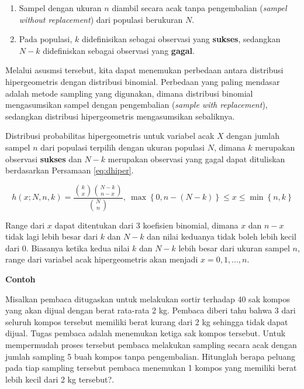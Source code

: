 \documentclass[]{book}
\providecommand{\tightlist}{%
  \setlength{\itemsep}{0pt}\setlength{\parskip}{0pt}}
\begin{document}
\begin{enumerate}
\def\labelenumi{\arabic{enumi}.}
\tightlist
\item
  Sampel dengan ukuran \(n\) diambil secara acak tanpa pengembalian
  (\emph{sampel without replacement}) dari populasi berukuran \(N\).
\item
  Pada populasi, \(k\) didefinisikan sebagai observasi yang
  \textbf{sukses}, sedangkan \(N-k\) didefiniskan sebagai observasi yang
  \textbf{gagal}.
\end{enumerate}

Melalui asusmsi tersebut, kita dapat menemukan perbedaan antara
distribusi hipergeometris dengan distribusi binomial. Perbedaan yang
paling mendasar adalah metode sampling yang digunakan, dimana distribusi
binomial mengasumsikan sampel dengan pengembalian (\emph{sample with
replacement}), sedangkan distribusi hipergeometris mengasumsikan
sebaliknya.

Distribusi probabilitas hipergeometris untuk variabel acak \(X\) dengan
jumlah sampel \(n\) dari populasi terpilih dengan ukuran populasi \(N\),
dimana \(k\) merupakan observasi \textbf{sukses} dan \(N-k\) merupakan
observasi yang gagal dapat dituliskan berdasarkan Persamaan
\eqref{eq:dhiper}.

\begin{equation}
   h\left(x;N,n,k\right)=\frac{\binom{k}{x}\binom{N-k}{n-x}}{\binom{N}{n}},\ \max\left\{0,n-\left(N-k\right)\right\}\le x\le\min\left\{n,k\right\}
  \label{eq:dhiper}
\end{equation}

Range dari \(x\) dapat ditentukan dari 3 koefisien binomial, dimana
\(x\) dan \(n-x\) tidak lagi lebih besar dari \(k\) dan \(N-k\) dan
nilai keduanya tidak boleh lebih kecil dari 0. Biasanya ketika kedua
nilai \(k\) dan \(N-k\) lebih besar dari ukuran sampel \(n\), range dari
variabel acak hipergeometris akan menjadi \(x=0,1,...,n\).

\textbf{Contoh}

Misalkan pembaca ditugaskan untuk melakukan sortir terhadap 40 sak
kompos yang akan dijual dengan berat rata-rata 2 kg. Pembaca diberi tahu
bahwa 3 dari seluruh kompos tersebut memiliki berat kurang dari 2 kg
sehingga tidak dapat dijual. Tugas pembaca adalah menemukan ketiga sak
kompos tersebut. Untuk mempermudah proses tersebut pembaca melakukan
sampling secara acak dengan jumlah sampling 5 buah kompos tanpa
pengembalian. Hitunglah berapa peluang pada tiap sampling tersebut
pembaca menemukan 1 kompos yang memiliki berat lebih kecil dari 2 kg
tersebut?.
\end{document}
